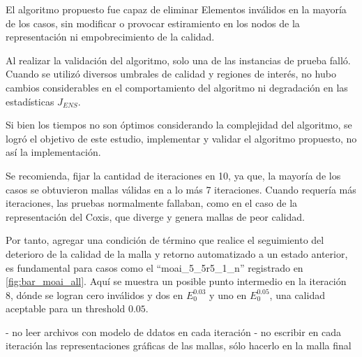 



El algoritmo propuesto fue capaz de eliminar Elementos inválidos en la mayoría de los casos, sin modificar o provocar estiramiento en los nodos de la representación ni empobrecimiento de la calidad.

Al realizar la validación del algoritmo, solo una de las instancias de prueba falló. Cuando se utilizó diversos umbrales de calidad y regiones de interés, no hubo cambios considerables en el comportamiento del algoritmo ni degradación en las estadísticas $J_{ENS}$.

Si bien los tiempos no son óptimos considerando la complejidad del algoritmo, se logró el objetivo de este estudio, implementar y validar el algoritmo propuesto, no así la implementación.

Se recomienda, fijar la cantidad de iteraciones en 10, ya que, la mayoría de los casos se obtuvieron mallas válidas en a lo más 7 iteraciones. Cuando requería más iteraciones, las pruebas normalmente fallaban, como en el caso de la representación del Coxis, que diverge y genera mallas de peor calidad.



Por tanto, agregar una condición de término que realice el seguimiento del deterioro de la calidad de la malla y retorno automatizado a un estado anterior, es fundamental para casos como el ``moai\_5\_5r5\_1\_n'' registrado en \autoref{fig:bar_moai_all}. Aquí se muestra un posible punto intermedio en la iteración 8, dónde se logran cero \elements{} inválidos y dos \elements{} en $E_0^{0.03}$ y uno en $E_0^{0.05}$, una calidad aceptable para un threshold $0.05$. 


	- no leer archivos con modelo de ddatos en cada iteración
	- no escribir en cada iteración las representaciones gráficas de las mallas, sólo hacerlo en la malla final
	
